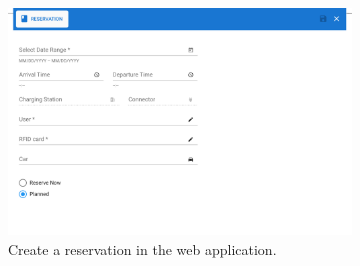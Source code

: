 \begin{figure}[h]
    \centering
    \begin{subfigure}[c]{0.6\textwidth}
        \includegraphics[width=\textwidth]{resources/images/main/6_implementation/screens/create_reservation/web/Create_Reservation.png}
        \captionsetup{skip=30pt}
        \caption{Create a reservation in the web application.}
        \label{fig:web-create-reservation-impl}
    \end{subfigure}
    \hfill
    \begin{subfigure}[c]{0.3\textwidth}

\end{subfigure}
\end{figure}
